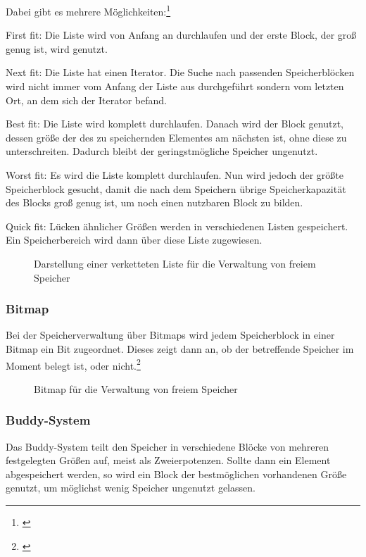 Dabei gibt es mehrere Möglichkeiten:\footnote{\cite[S.~250--251]{Tanenbaum.2016}}

First fit: Die Liste wird von Anfang an durchlaufen und der erste Block, der groß genug ist, wird genutzt.

Next fit: Die Liste hat einen Iterator. Die Suche nach passenden Speicherblöcken wird nicht immer vom Anfang der Liste aus durchgeführt sondern vom letzten Ort, an dem sich der Iterator befand.

Best fit: Die Liste wird komplett durchlaufen. Danach wird der Block genutzt, dessen größe der des zu speichernden Elementes am nächsten ist, ohne diese zu unterschreiten. Dadurch bleibt der geringstmögliche Speicher ungenutzt.

Worst fit: Es wird die Liste komplett durchlaufen. Nun wird jedoch der größte Speicherblock gesucht, damit die nach dem Speichern übrige Speicherkapazität des Blocks groß genug ist, um noch einen nutzbaren Block zu bilden.

Quick fit: Lücken ähnlicher Größen werden in verschiedenen Listen gespeichert. Ein Speicherbereich wird dann über diese Liste zugewiesen.

\begin{figure}[htb]
	\centering
	\caption{Darstellung einer verketteten Liste für die Verwaltung von freiem Speicher}
\end{figure}

\subsubsection{Bitmap}
Bei der Speicherverwaltung über Bitmaps wird jedem Speicherblock in einer Bitmap ein Bit zugeordnet. Dieses zeigt dann an, ob der betreffende Speicher im Moment belegt ist, oder nicht.\footnote{\cite[S.~248--249]{Tanenbaum.2016}}

\begin{figure}[htb]
	\centering
	\caption{Bitmap für die Verwaltung von freiem Speicher}
\end{figure}

\subsubsection{Buddy-System}
Das Buddy-System teilt den Speicher in verschiedene Blöcke von mehreren festgelegten Größen auf, meist als Zweierpotenzen. Sollte dann ein Element abgespeichert werden, so wird ein Block der bestmöglichen vorhandenen Größe genutzt, um möglichst wenig Speicher ungenutzt gelassen.

